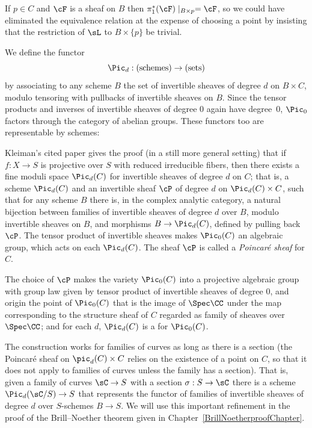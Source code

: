 If $p \in C$ and $\cF$ is a sheaf on $B$ then $\pi_1^*(\cF)\mid_{B\times p} = \cF$, so we could have eliminated the
equivalence relation at the expense of choosing a point by insisting that the restriction of $\sL$ to $B \times \{p\}$ be trivial.
 
We define the functor
%
 $$
 \Pic_d : (\textrm{schemes}) \to (\textrm{sets})
 $$
by associating to any scheme $B$ the set of invertible sheaves of
degree $d$ on $B \times C$, modulo tensoring with pullbacks of
invertible sheaves on $B$. Since the tensor products and inverses of
invertible sheaves of degree 0 again 
have
degree~0, 
$\Pic_0$ factors through the category of abelian groups. These
functors too are representable by schemes:
  
\begin{fact}
\label{picard existence1} 
Kleiman's cited paper gives the proof (in a still more general setting) that if
$f:X\to S$ is projective over $S$ with reduced irreducible fibers, then
there exists a fine moduli space $\Pic_d(C)$ for invertible sheaves of
degree $d$ on $C$; that is, a scheme $\Pic_d(C)$ and an invertible
sheaf $\cP$ of degree $d$ on $\Pic_d(C) \times C$, such that for any
scheme $B$ there is, in the complex analytic category, a natural bijection between families of invertible
sheaves of degree $d$ over $B$, modulo invertible sheaves on $B$, and
morphisms $B \to \Pic_d(C)$, defined by pulling back $\cP$. The tensor
product of invertible sheaves makes $\Pic_0(C)$ an algebraic group,
which acts on each $\Pic_d(C)$. The sheaf $\cP$ is called a
%
\emph{Poincar\'e sheaf} for $C$. 

The choice of $\cP$ makes the variety $\Pic_0(C)$ into a 
projective algebraic group
%
%
with group law given by tensor product of
invertible sheaves of degree 0, and origin the point of $\Pic_0(C)$
that is the 
 image of $\Spec \CC$ under the map corresponding to the structure sheaf of $C$ regarded
 as family of sheaves over $\Spec \CC$; and for each $d$, $\Pic_d(C)$
 is a 
%
for $\Pic_0(C)$. 

The construction works for families of curves as long as there is a section (the Poincar\'e sheaf on $\pic_d(C) \times C$ relies on the existence of a point on $C$, so that it does not apply to families of curves unless the family has a section). That is, given a family of curves $\sC \to S$ with a section $\sigma: S\to \sC$
 there is a scheme $\Pic_{d}(\sC/S) \to S$ that represents the functor of families of invertible sheaves of
 degree $d$ over $S$-schemes $B\to S$. We will use this important refinement in the proof of the Brill--Noether theorem given in Chapter~\ref{BrillNoetherproofChapter}.
  \end{fact}
  
